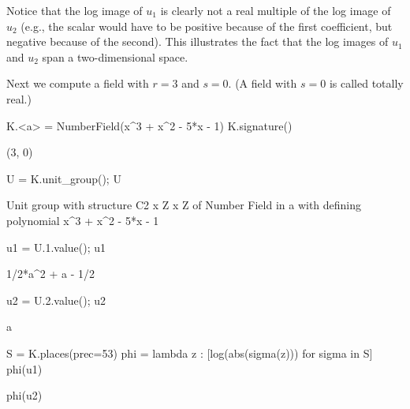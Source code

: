 Notice that the log image of $u_1$ is clearly not a real multiple of
the log image of $u_2$ (e.g., the scalar would have to be positive
because of the first coefficient, but negative because of the second).
This illustrates the fact that the log images of $u_1$ and $u_2$ span
a two-dimensional space.

Next we compute a field with $r=3$ and $s=0$.  (A field with $s=0$
is called totally real.)
\begin{sagecode}
\begin{sagecell}
K.<a> = NumberField(x^3 + x^2 - 5*x - 1)
K.signature()
\end{sagecell}
\begin{sageout}
(3, 0)
\end{sageout}
\begin{sagecell}
U = K.unit_group(); U
\end{sagecell}
\begin{sageout}
Unit group with structure C2 x Z x Z of Number Field in a with
defining polynomial x^3 + x^2 - 5*x - 1
\end{sageout}
\begin{sagecell}
u1 = U.1.value(); u1
\end{sagecell}
\begin{sageout}
1/2*a^2 + a - 1/2
\end{sageout}
\begin{sagecell}
u2 = U.2.value(); u2
\end{sagecell}
\begin{sageout}
a
\end{sageout}
\begin{sagecell}
S = K.places(prec=53)
phi = lambda z : [log(abs(sigma(z))) for sigma in S]
phi(u1)
\end{sagecell}
\begin{sageout}
[-0.7747670223461895, -0.3928487245813982, 1.1676157469275887]
\end{sageout}
\begin{sagecell}
phi(u2)
\end{sagecell}
\begin{sageout}
[0.9966812040934553, -1.6402241503223172, 0.6435429462288627]
\end{sageout}
\end{sagecode}

